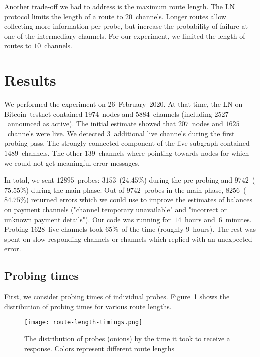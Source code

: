 Another trade-off we had to address is the maximum route length.
The LN protocol limits the length of a route to $20$~channels.
Longer routes allow collecting more information per probe, but increase the probability of failure at one of the intermediary channels.
For our experiment, we limited the length of routes to $10$~channels.


\section{Results} \label{sec:results}

We performed the experiment on 26~February~2020.
At that time, the LN on Bitcoin~testnet contained $1974$~nodes and $5884$~channels (including $2527$~announced as active).
The initial estimate showed that $207$~nodes and $1625$~channels were live.
We detected $3$~additional live channels during the first probing pass.
The strongly connected component of the live subgraph contained $1489$~channels.
The other $139$~channels where pointing towards nodes for which we could not get meaningful error messages.

In total, we sent $12895$~probes: $3153$~($24.45\%$) during the pre-probing and $9742$~($75.55\%$) during the main phase.
Out of $9742$~probes in the main phase, $8256$~($84.75\%$) returned errors which we could use to improve the estimates of balances on payment channels ("channel temporary unavailable" and "incorrect or unknown payment details").
Our code was running for~$14$~hours and~$6$~minutes. %
Probing $1628$~live channels took $65\%$~of the time (roughly $9$~hours).
The rest was spent on slow-responding channels or channels which replied with an unexpected error.


\subsection{Probing times}

First, we consider probing times of individual probes.
Figure~\ref{fig:route-length-timings} shows the distribution of probing times for various route lengths.

\begin{figure}[ht]
	\centering
	\texttt{[image: route-length-timings.png]}
	\caption{The distribution of probes (onions) by the time it took to receive a response. Colors represent different route lengths}
	\label{fig:route-length-timings}
\end{figure}

